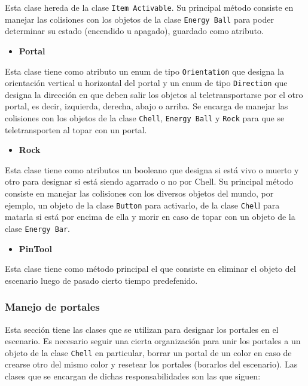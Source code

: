 \documentclass[a4paper]{article}
\begin{document}
Esta clase hereda de la clase \texttt{Item Activable}. Su principal método consiste en manejar las colisiones con los objetos de la clase \texttt{Energy Ball} para poder determinar su estado (encendido u apagado), guardado como atributo.

\begin{itemize}
	\item \textbf{Portal}
\end{itemize}

Esta clase tiene como atributo un enum de tipo \texttt{Orientation} que designa la orientación vertical u horizontal del portal y un enum de tipo \texttt{Direction} que designa la dirección en que deben salir los objetos al teletransportarse por el otro portal, es decir, izquierda, derecha, abajo o arriba. Se encarga de manejar las colisiones con los objetos de la clase \texttt{Chell}, \texttt{Energy Ball} y \texttt{Rock} para que se teletransporten al topar con un portal.

\begin{itemize}
	\item \textbf{Rock}
\end{itemize}

Esta clase tiene como atributos un booleano que designa si está vivo o muerto y otro para designar si está siendo agarrado o no por Chell. Su principal método consiste en manejar las colisiones con los diversos objetos del mundo, por ejemplo, un objeto de la clase \texttt{Button} para activarlo, de la clase \texttt{Chel}l para matarla si está por encima de ella y morir en caso de topar con un objeto de la clase \texttt{Energy Bar}.

\begin{itemize}
	\item \textbf{PinTool}
\end{itemize}

Esta clase tiene como método principal el que consiste en eliminar el objeto del escenario luego de pasado cierto tiempo predefenido.

\subsubsection{Manejo de portales}

Esta sección tiene las clases que se utilizan para designar los portales en el escenario. Es necesario seguir una cierta organización para unir los portales a un objeto de la clase \texttt{Chell} en particular, borrar un portal de un color en caso de crearse otro del mismo color y resetear los portales (borarlos del escenario). Las clases que se encargan de dichas responsabilidades son las que siguen:
\end{document}
